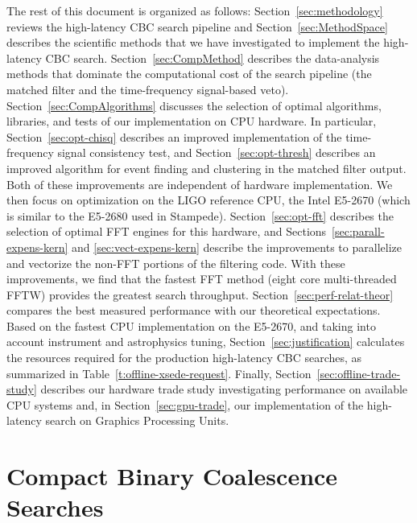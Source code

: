 The rest of this document is organized as follows:
Section~\ref{sec:methodology} reviews the high-latency CBC search pipeline and 
Section~\ref{sec:MethodSpace} describes the  scientific methods that
we have investigated to implement the high-latency CBC search.
Section~\ref{sec:CompMethod} describes the
data-analysis methods that dominate the computational cost of the search
pipeline (the matched filter and the time-frequency signal-based veto).
Section~\ref{sec:CompAlgorithms} discusses the selection of optimal
algorithms, libraries, and tests of our implementation on CPU hardware. In particular,
Section~\ref{sec:opt-chisq} describes an improved implementation of the
time-frequency signal consistency test, and Section~\ref{sec:opt-thresh}
describes an improved algorithm for event finding and clustering in the
matched filter output. Both of these improvements are independent of hardware
implementation. We then focus on optimization on the LIGO reference CPU, the
Intel\textsuperscript{\textregistered} E5-2670 (which is similar to the E5-2680 used in Stampede).
Section~\ref{sec:opt-fft} describes the selection of optimal FFT engines for
this hardware, and Sections~\ref{sec:parall-expens-kern} and
\ref{sec:vect-expens-kern} describe the improvements to parallelize and
vectorize the non-FFT portions of the filtering code. With these improvements,
we find that the fastest FFT method (eight core multi-threaded FFTW) provides
the greatest search throughput. Section~\ref{sec:perf-relat-theor} compares the
best measured performance with our theoretical expectations.
Based on the fastest CPU implementation on the E5-2670, and taking into account instrument and astrophysics tuning, Section~\ref{sec:justification} calculates the
resources required for the production high-latency CBC searches, as summarized
in Table~\ref{t:offline-xsede-request}.   Finally,
Section~\ref{sec:offline-trade-study} describes our hardware trade study
investigating performance on available CPU systems and, in
Section~\ref{sec:gpu-trade}, our implementation of the high-latency search on
Graphics Processing Units.

\vspace*{-10pt}
 \section{Compact Binary Coalescence Searches} 
\vspace*{-5pt}
 \label{sec:methodology}


